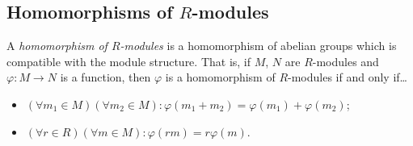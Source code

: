 \subsection{Homomorphisms of $R$-modules}\label{homomorphismofrmodule}
A \emph{homomorphism of $R$-modules} is a homomorphism of abelian groups which is compatible with the module
structure. That is, if $M$, $N$ are $R$-modules and $\varphi : M \rightarrow N$ is a function, then $\varphi$
is a homomorphism of $R$-modules if and only if\dots
\begin{itemize}
  \item $(\forall m_1 \in M)(\forall m_2 \in M) : \varphi(m_1 + m_2) = \varphi(m_1) + \varphi(m_2)$;
  \item $(\forall r \in R)(\forall m \in M) : \varphi(rm) = r\varphi(m).$
\end{itemize}